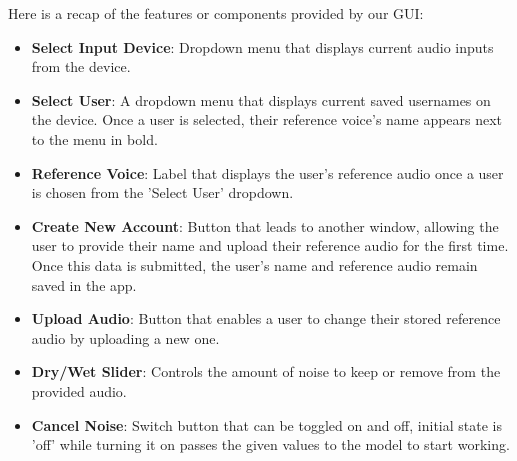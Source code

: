 Here is a recap of the features or components provided by our GUI:
\begin{itemize}
	\item \textbf{Select Input Device}: Dropdown menu that displays current audio inputs from the device.
	\item \textbf{Select User}: A dropdown menu that displays current saved usernames on the device. Once a user is selected, their reference voice's name appears next to the menu in bold.
	\item \textbf{Reference Voice}: Label that displays the user's reference audio once a user is chosen from the 'Select User' dropdown.
	\item \textbf{Create New Account}: Button that leads to another window, allowing the user to provide their name and upload their reference audio for the first time. Once this data is submitted, the user's name and reference audio remain saved in the app.
	\item \textbf{Upload Audio}: Button that enables a user to change their stored reference audio by uploading a new one.
	\item \textbf{Dry/Wet Slider}: Controls the amount of noise to keep or remove from the provided audio.
	\item \textbf{Cancel Noise}: Switch button that can be toggled on and off, initial state is 'off' while turning it on passes the given values to the model to start working.
\end{itemize}
